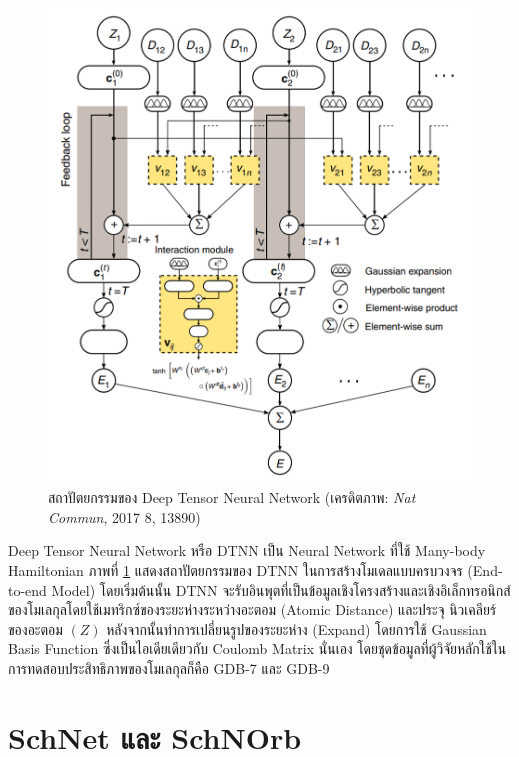 \begin{figure}[H]
    \centering
    \includegraphics[width=\linewidth]{fig/dtnn.png}
    \caption{สถาปัตยกรรมของ Deep Tensor Neural Network (เครดิตภาพ: \textit{Nat Commun}, 2017 8, 13890)}
    \label{fig:dtnn_architect}
\end{figure}

Deep Tensor Neural Network หรือ DTNN\autocite{schutt2017a} เป็น Neural Network ที่ใช้ Many-body Hamiltonian ภาพที่ 
\ref{fig:dtnn_architect} แสดงสถาปัตยกรรมของ DTNN ในการสร้างโมเดลแบบครบวงจร (End-to-end Model) โดยเริ่มต้นนั้น DTNN 
จะรับอินพุตที่เป็นข้อมูลเชิงโครงสร้างและเชิงอิเล็กทรอนิกส์ของโมเลกุลโดยใช้เมทริกซ์ของระยะห่างระหว่างอะตอม (Atomic Distance) และประจุ%
นิวเคลียร์ของอะตอม $(Z)$ หลังจากนั้นทำการเปลี่ยนรูปของระยะห่าง (Expand) โดยการใช้ Gaussian Basis Function ซึ่งเป็นไอเดียเดียวกับ 
Coulomb Matrix นั่นเอง โดยชุดข้อมูลที่ผู้วิจัยหลักใช้ในการทดสอบประสิทธิภาพของโมเลกุลก็คือ GDB-7 และ GDB-9

\section{SchNet และ SchNOrb}
\label{sec:schnet_schnorb}

